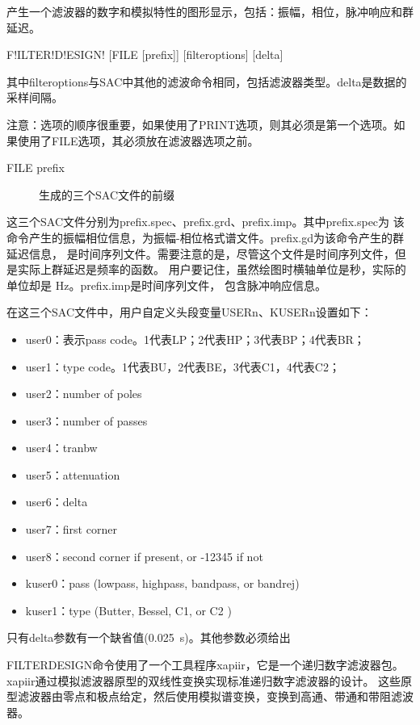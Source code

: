 \label{cmd:filterdesign}

产生一个滤波器的数字和模拟特性的图形显示，包括：振幅，相位，脉冲响应和群延迟。

\begin{SACSTX}
F!ILTER!D!ESIGN! [FILE [prefix]] [filteroptions] [delta]
\end{SACSTX}
其中filteroptions与SAC中其他的滤波命令相同，包括滤波器类型。delta是数据的采样间隔。

注意：选项的顺序很重要，如果使用了PRINT选项，则其必须是第一个选项。如果使用了FILE选项，其必须放在滤波器选项之前。

\begin{description}
\item [FILE prefix] 生成的三个SAC文件的前缀
\end{description}

这三个SAC文件分别为prefix.spec、prefix.grd、prefix.imp。其中prefix.spec为
该命令产生的振幅相位信息，为振幅-相位格式谱文件。prefix.gd为该命令产生的群延迟信息，
是时间序列文件。需要注意的是，尽管这个文件是时间序列文件，但是实际上群延迟是频率的函数。
用户要记住，虽然绘图时横轴单位是秒，实际的单位却是 \si{\Hz}。prefix.imp是时间序列文件，
包含脉冲响应信息。

在这三个SAC文件中，用户自定义头段变量USERn、KUSERn设置如下：
\begin{itemize}
\item user0：表示pass code。1代表LP；2代表HP；3代表BP；4代表BR；
\item user1：type code。1代表BU，2代表BE，3代表C1，4代表C2；
\item user2：number of poles
\item user3：number of passes
\item user4：tranbw
\item user5：attenuation
\item user6：delta
\item user7：first corner
\item user8：second corner if present, or -12345 if not
\item kuser0：pass (lowpass, highpass, bandpass, or bandrej)
\item kuser1：type (Butter, Bessel, C1, or C2 )
\end{itemize}

只有delta参数有一个缺省值(\SI{0.025}{\s})。其他参数必须给出

FILTERDESIGN命令使用了一个工具程序xapiir，它是一个递归数字滤波器包。
xapiir通过模拟滤波器原型的双线性变换实现标准递归数字滤波器的设计。
这些原型滤波器由零点和极点给定，然后使用模拟谱变换，变换到高通、带通和带阻滤波器。

